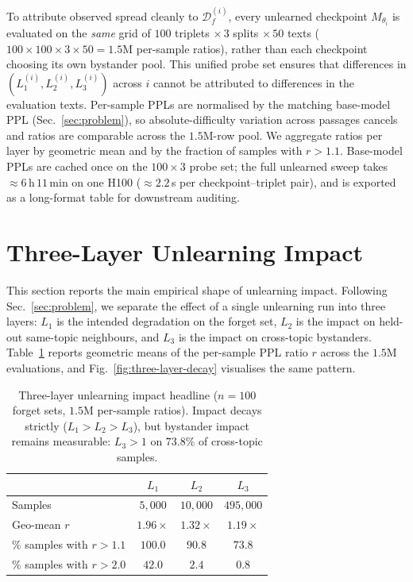 \documentclass[11pt]{article}
\newcommand{\Df}{\mathcal{D}_f}
\newcommand{\Lone}{L_1}
\newcommand{\Ltwo}{L_2}
\newcommand{\Lthree}{L_3}
\begin{document}
To attribute observed spread cleanly to $\Df^{(i)}$, every unlearned checkpoint
$M_{\theta_i}$ is evaluated on the \emph{same} grid of $100$ triplets $\times\,3$
splits $\times\,50$ texts ($100 \times 100 \times 3 \times 50 = 1{.}5$M
per-sample ratios), rather than each checkpoint choosing its own bystander pool. This unified probe set ensures that differences in
$(\Lone^{(i)},\Ltwo^{(i)},\Lthree^{(i)})$ across $i$ cannot be attributed to
differences in the evaluation texts. Per-sample PPLs are normalised by the
matching base-model PPL (Sec.~\ref{sec:problem}), so absolute-difficulty
variation across passages cancels and ratios are comparable across the
$1.5$M-row pool. We aggregate ratios per layer by geometric mean and by the
fraction of samples with $r{>}1.1$. Base-model PPLs are cached once on the
$100\times3$ probe set; the full unlearned sweep takes $\approx 6$\,h\,$11$\,min
on one H100 ($\approx 2.2$\,s per checkpoint--triplet pair), and is exported as
a long-format table for downstream auditing.

\section{Three-Layer Unlearning Impact}
\label{sec:three-layer}

This section reports the main empirical shape of unlearning impact. Following
Sec.~\ref{sec:problem}, we separate the effect of a single unlearning run into
three layers: $\Lone$ is the intended degradation on the forget set,
$\Ltwo$ is the impact on held-out same-topic neighbours, and $\Lthree$ is the
impact on cross-topic bystanders. Table~\ref{tab:headline} reports geometric
means of the per-sample PPL ratio $r$ across the $1.5$M evaluations, and
Fig.~\ref{fig:three-layer-decay} visualises the same pattern.

\begin{table}[t]
\centering
\small
\setlength{\tabcolsep}{4pt}
\begin{tabular}{@{}lccc@{}}
    \toprule
                                                   & $\Lone$ & $\Ltwo$ & $\Lthree$ \\
    \midrule
    Samples                                        & $5{,}000$ & $10{,}000$ & $495{,}000$ \\
    Geo-mean $r$                                   & \textbf{$1.96\times$} & \textbf{$1.32\times$} & \textbf{$1.19\times$} \\
    \% samples with $r{>}1.1$                      & $100.0$ & $90.8$ & $73.8$ \\
    \% samples with $r{>}2.0$                      & $42.0$  & $2.4$  & $0.8$ \\
    \bottomrule
\end{tabular}
\caption{Three-layer unlearning impact headline ($n{=}100$ forget sets, $1.5$M per-sample ratios). Impact decays strictly ($\Lone{>}\Ltwo{>}\Lthree$), but bystander impact remains measurable: $\Lthree{>}1$ on $73.8\%$ of cross-topic samples.}
\label{tab:headline}
\end{table}
\end{document}
